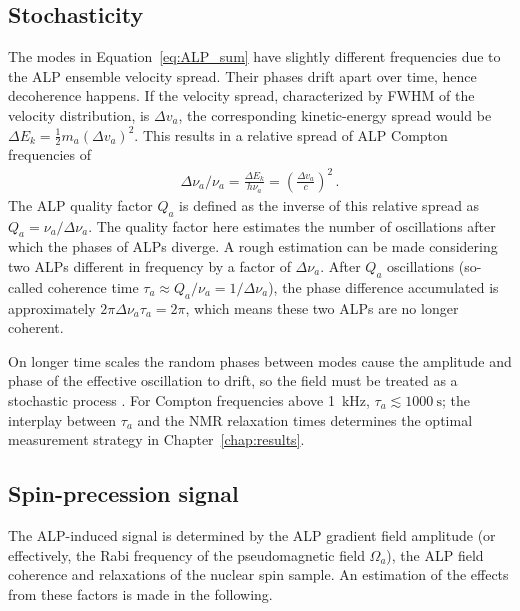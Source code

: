 \subsection{Stochasticity}\label{sec:theory:stochasticity}

The modes in Equation~\eqref{eq:ALP_sum} have slightly different frequencies due to the ALP ensemble velocity spread. Their phases drift apart over time, hence decoherence happens. 
If the velocity spread, characterized by FWHM of the velocity distribution, is $\Delta v_a$, the corresponding kinetic-energy spread would be $\Delta E_k = \tfrac{1}{2} m_a (\Delta v_a)^2$. This results in a relative spread of ALP Compton frequencies of 
\begin{align}
    \Delta \nu_a / \nu_a = \frac{\Delta E_k}{h \nu_a} = \left(\frac{\Delta v_a}{c}\right)^2\,.
\end{align}
The ALP quality factor $Q_a$ is defined as the inverse of this relative spread as $Q_a =\nu_a / \Delta \nu_a$. 
The quality factor here estimates the number of oscillations after which the phases of ALPs diverge. 
A rough estimation can be made considering two ALPs different in frequency by a factor of $\Delta \nu_a$. After $Q_a$ oscillations (so-called coherence time $\tau_a \approx Q_a / \nu_a = 1 / \Delta \nu_a$), the phase difference accumulated is approximately $2 \pi \Delta \nu_a \tau_a = 2 \pi$, which means these two ALPs are no longer coherent. 

On longer time scales the random phases between modes cause the amplitude and phase of the effective oscillation to drift, so the field must be treated as a stochastic process \cite{Centers2021Stochastic,Gramolin2022Feb_SpectralSignatures}. 
For Compton frequencies above \SI{1}{\kHz}, $\tau_a \lesssim \SI{1000}{\second}$; the interplay between $\tau_a$ and the NMR relaxation times determines the optimal measurement strategy in Chapter~\ref{chap:results}.


\subsection{Spin-precession signal}\label{sec:theory:signal}

The ALP-induced signal is determined by the ALP gradient field amplitude (or effectively, the Rabi frequency of the pseudomagnetic field $\Omega_a$), the ALP field coherence and relaxations of the nuclear spin sample. An estimation of the effects from these factors is made in the following. 


